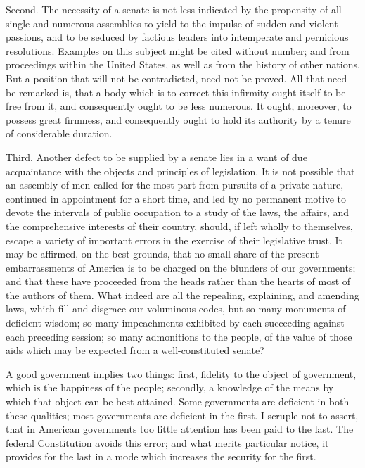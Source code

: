 Second. The necessity of a senate is not less indicated by the propensity of all single and numerous assemblies to yield to the impulse of sudden and violent passions, and to be seduced by factious leaders into intemperate and pernicious resolutions. Examples on this subject might be cited without number; and from proceedings within the United States, as well as from the history of other nations. But a position that will not be contradicted, need not be proved. All that need be remarked is, that a body which is to correct this infirmity ought itself to be free from it, and consequently ought to be less numerous. It ought, moreover, to possess great firmness, and consequently ought to hold its authority by a tenure of considerable duration.

Third. Another defect to be supplied by a senate lies in a want of due acquaintance with the objects and principles of legislation. It is not possible that an assembly of men called for the most part from pursuits of a private nature, continued in appointment for a short time, and led by no permanent motive to devote the intervals of public occupation to a study of the laws, the affairs, and the comprehensive interests of their country, should, if left wholly to themselves, escape a variety of important errors in the exercise of their legislative trust. It may be affirmed, on the best grounds, that no small share of the present embarrassments of America is to be charged on the blunders of our governments; and that these have proceeded from the heads rather than the hearts of most of the authors of them. What indeed are all the repealing, explaining, and amending laws, which fill and disgrace our voluminous codes, but so many monuments of deficient wisdom; so many impeachments exhibited by each succeeding against each preceding session; so many admonitions to the people, of the value of those aids which may be expected from a well-constituted senate?

A good government implies two things: first, fidelity to the object of government, which is the happiness of the people; secondly, a knowledge of the means by which that object can be best attained. Some governments are deficient in both these qualities; most governments are deficient in the first. I scruple not to assert, that in American governments too little attention has been paid to the last. The federal Constitution avoids this error; and what merits particular notice, it provides for the last in a mode which increases the security for the first.

